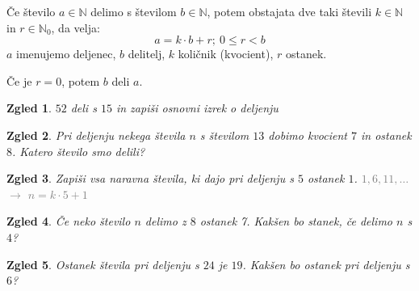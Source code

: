\documentclass{article}
\newtheorem*{zgled}{Zgled}
\begin{document}
Če število $a\in\mathbb{N}$ delimo s številom $b\in\mathbb{N}$, potem obstajata dve taki števili $k\in\mathbb{N}$ in $r\in\mathbb{N}_0$, da velja:
\[a=k\cdot b +r; \ 0\leq r<b\]
$a$ imenujemo deljenec, $b$ delitelj, $k$ količnik (kvocient), $r$ ostanek.

Če je $r=0$, potem $b$ deli $a$.

\begin{zgled}
    $52$ deli s $15$ in zapiši osnovni izrek o deljenju
\end{zgled}

\begin{zgled}
    Pri deljenju nekega števila $n$ s številom $13$ dobimo kvocient $7$ in ostanek $8$. Katero število smo delili?
\end{zgled}

\begin{zgled}
    Zapiši vsa naravna števila, ki dajo pri deljenju s $5$ ostanek $1$. \textcolor{gray}{$1,6,11, \ldots$ $\rightarrow$ $n=k\cdot 5 +1$}
\end{zgled}

\begin{zgled}
    Če neko število $n$ delimo z $8$ ostanek 7. Kakšen bo stanek, če delimo $n$ s $4$?
\end{zgled}

\begin{zgled}
    Ostanek števila pri deljenju s $24$ je $19$. Kakšen bo ostanek pri deljenju s $6$?
\end{zgled}
\end{document}
